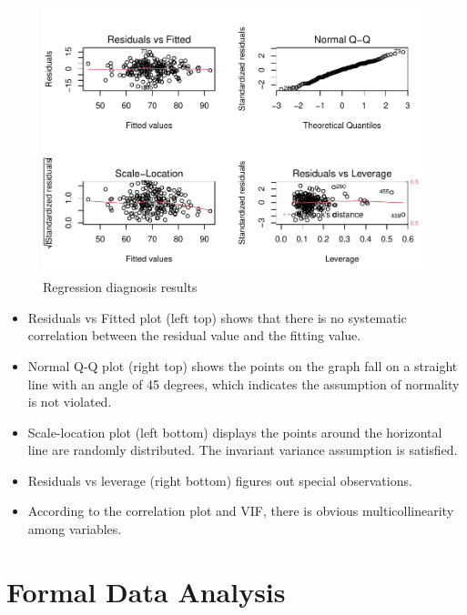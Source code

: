 \documentclass[
]{article}
\begin{document}
\begin{figure}

{\centering \includegraphics{RMD-Group-28_files/figure-latex/unnamed-chunk-7-1} 

}

\caption{\label{fig:dia} Regression diagnosis results}\label{fig:unnamed-chunk-7}
\end{figure}

\begin{itemize}
\item
  Residuals vs Fitted plot (left top) shows that there is no systematic
  correlation between the residual value and the fitting value.
\item
  Normal Q-Q plot (right top) shows the points on the graph fall on a
  straight line with an angle of 45 degrees, which indicates the
  assumption of normality is not violated.
\item
  Scale-location plot (left bottom) displays the points around the
  horizontal line are randomly distributed. The invariant variance
  assumption is satisfied.
\item
  Residuals vs leverage (right bottom) figures out special observations.
\item
  According to the correlation plot and VIF, there is obvious
  multicollinearity among variables.
\end{itemize}

\hypertarget{sec:FDA}{%
\section{Formal Data Analysis}\label{sec:FDA}}
\end{document}
